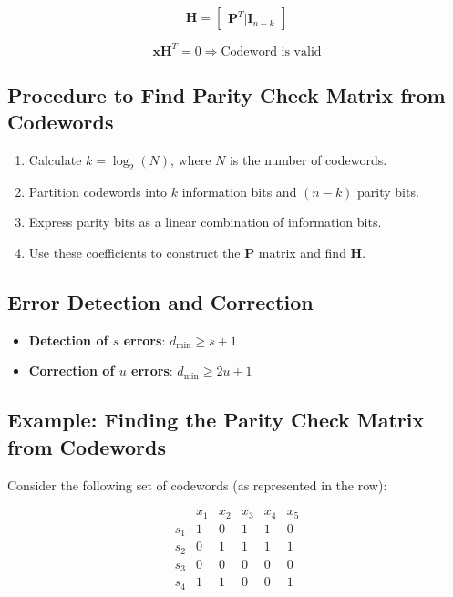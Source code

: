 \documentclass[10pt]{article}
\begin{document}
\[
\mathbf{H} = \begin{bmatrix} \mathbf{P}^T | \mathbf{I}_{n-k} \end{bmatrix}
\]

\[
\mathbf{x} \mathbf{H}^T = 0 \Rightarrow \text{Codeword is valid}
\]

\subsection{Procedure to Find Parity Check Matrix from Codewords}
\begin{enumerate}
    \item Calculate $k = \log_2(N)$, where $N$ is the number of codewords.
    \item Partition codewords into $k$ information bits and $(n - k)$ parity bits.
    \item Express parity bits as a linear combination of information bits.
    \item Use these coefficients to construct the $\mathbf{P}$ matrix and find $\mathbf{H}$.
\end{enumerate}

\subsection{Error Detection and Correction}
\begin{itemize}
    \item \textbf{Detection of $s$ errors}: $d_{\text{min}} \geq s + 1$
    \item \textbf{Correction of $u$ errors}: $d_{\text{min}} \geq 2u + 1$
\end{itemize}

\subsection{Example: Finding the Parity Check Matrix from Codewords}

Consider the following set of codewords (as represented in the row):

\[
\begin{array}{c|ccccc}
& x_1 & x_2 & x_3 & x_4 & x_5 \\
\hline
s_1 & 1 & 0 & 1 & 1 & 0 \\
s_2 & 0 & 1 & 1 & 1 & 1 \\
s_3 & 0 & 0 & 0 & 0 & 0 \\
s_4 & 1 & 1 & 0 & 0 & 1 \\
\end{array}
\]
\end{document}
